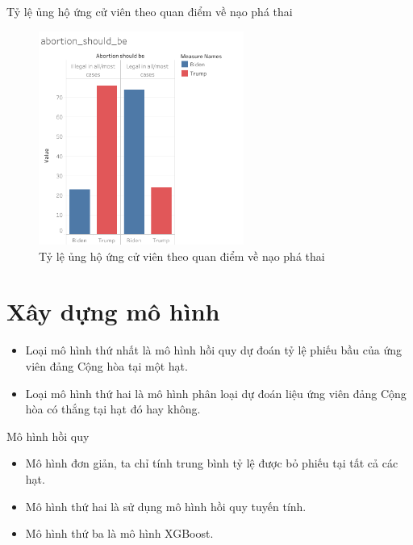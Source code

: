 \documentclass[10pt]{beamer}
\theoremstyle{remark}
\theoremstyle{definition}
\begin{document}
\begin{frame}{Tỷ lệ ủng hộ ứng cử viên theo quan điểm về nạo phá thai}
	\begin{figure}[h!]
        \centering
        \includegraphics[width=0.6\textwidth]{figures/abortion_should_be.png}
        \caption{Tỷ lệ ủng hộ ứng cử viên theo quan điểm về nạo phá thai}
    \end{figure}
\end{frame}

\section{Xây dựng mô hình}

\begin{frame}
	\begin{itemize}
		\item Loại mô hình thứ nhất là mô hình hồi quy dự đoán tỷ lệ phiếu bầu của ứng viên đảng Cộng hòa tại một hạt.
		\item Loại mô hình thứ hai là mô hình phân loại dự đoán liệu ứng viên đảng Cộng hòa có thắng tại hạt đó hay không.
	\end{itemize}
\end{frame}

\begin{frame}{Mô hình hồi quy}

    \begin{itemize}
        \item Mô hình đơn giản, ta chỉ tính trung bình tỷ lệ được bỏ phiếu tại tất cả các hạt.
        \item Mô hình thứ hai là sử dụng mô hình hồi quy tuyến tính.
        \item Mô hình thứ ba là mô hình XGBoost.
    \end{itemize}
\end{frame}
\end{document}

